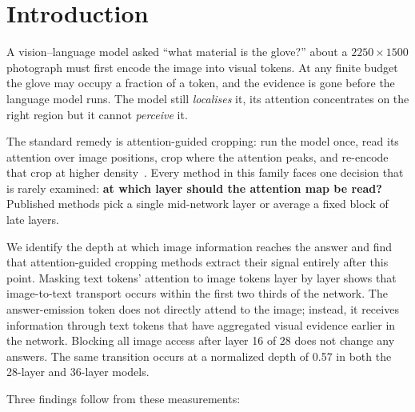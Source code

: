 \documentclass{article} %
\begin{document}
\section{Introduction}

A vision--language model asked ``what material is the glove?'' about a $2250\times1500$ photograph must first encode
the image into visual tokens. At any finite budget the glove may occupy a fraction of a token, and the evidence is
gone before the language model runs. The model still \emph{localises} it, its attention concentrates on the right
region but it cannot \emph{perceive} it.

The standard remedy is attention-guided cropping: run the model once, read its attention over image positions, crop
where the attention peaks, and re-encode that crop at higher density~\citep{vicrop,zoomeye}. Every method in this
family faces one decision that is rarely examined: \textbf{at which layer should the attention map be read?}
Published methods pick a single mid-network layer or average a fixed block of late layers.

We identify the depth at which image information reaches the answer and find that attention-guided cropping methods extract their signal entirely after this point. Masking text tokens' attention to image tokens layer by layer shows that image-to-text transport occurs within the first two thirds of the network. The answer-emission token does not directly attend to the image; instead, it receives information through text tokens that have aggregated visual evidence earlier in the network. Blocking all image access after layer 16 of 28 does not change any answers. The same transition occurs at a normalized depth of 0.57 in both the 28-layer and 36-layer models.


Three findings follow from these measurements:
\end{document}
